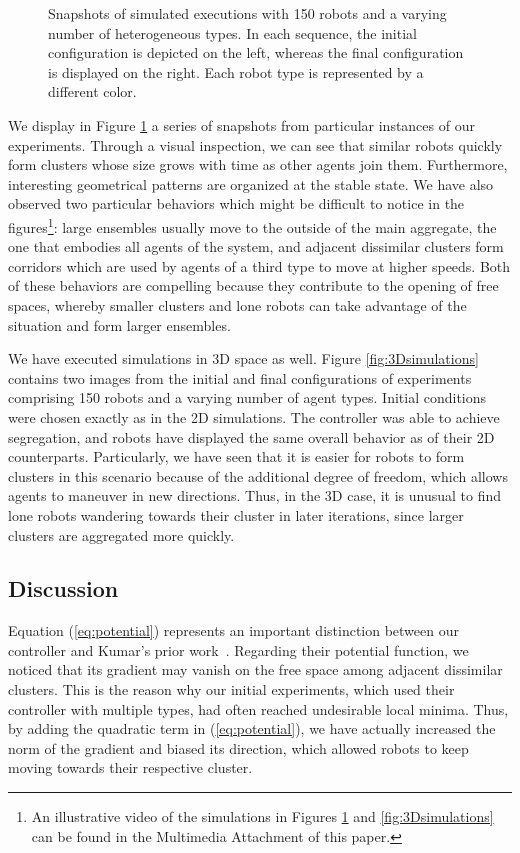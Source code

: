 \documentclass[letterpaper, 10 pt, conference]{ieeeconf}  %
\begin{document}
\begin{figure}[thpb]
\caption{Snapshots of simulated executions with 150 robots and a
  varying number of heterogeneous types. In each sequence, the initial
  configuration is depicted on the left, whereas the final
  configuration is displayed on the right. Each robot type is
  represented by a different color.}
\label{fig:simulations}
\end{figure}

We display in Figure \ref{fig:simulations} a series of snapshots from
particular instances of our experiments. Through a visual inspection,
we can see that similar robots quickly form clusters whose size grows
with time as other agents join them. Furthermore, interesting
geometrical patterns are organized at the stable state. We have also
observed two particular behaviors which might be difficult to notice
in the figures\footnote{An illustrative video of the simulations in
  Figures \ref{fig:simulations} and \ref{fig:3Dsimulations} can be
  found in the Multimedia Attachment of this paper.}: large ensembles
usually move to the outside of the main aggregate, the one that
embodies all agents of the system, and adjacent dissimilar clusters
form corridors which are used by agents of a third type to move at
higher speeds. Both of these behaviors are compelling because they
contribute to the opening of free spaces, whereby smaller clusters and
lone robots can take advantage of the situation and form larger
ensembles.

We have executed simulations in 3D space as well. Figure
\ref{fig:3Dsimulations} contains two images from the initial and final
configurations of experiments comprising 150 robots and a varying
number of agent types. Initial conditions were chosen exactly as in
the 2D simulations. The controller was able to achieve segregation,
and robots have displayed the same overall behavior as of their 2D
counterparts. Particularly, we have seen that it is easier for robots
to form clusters in this scenario because of the additional degree of
freedom, which allows agents to maneuver in new directions. Thus, in
the 3D case, it is unusual to find lone robots wandering towards their
cluster in later iterations, since larger clusters are aggregated more
quickly.

\subsection{Discussion}

Equation (\ref{eq:potential}) represents an important distinction
between our controller and Kumar's prior
work~\cite{Kumar:10}. Regarding their potential function, we noticed
that its gradient may vanish on the free space among adjacent
dissimilar clusters. This is the reason why our initial experiments,
which used their controller with multiple types, had often reached
undesirable local minima. Thus, by adding the quadratic term in
(\ref{eq:potential}), we have actually increased the norm of the
gradient and biased its direction, which allowed robots to keep moving
towards their respective cluster.
\end{document}
